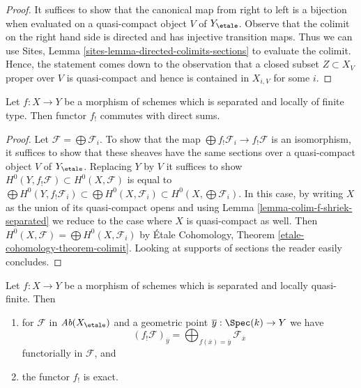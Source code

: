 \begin{proof}
It suffices to show that the canonical map from
right to left is a bijection when evaluated on a quasi-compact
object $V$ of $Y_\etale$.
Observe that the colimit on the right hand side is directed
and has injective transition maps.
Thus we can use
Sites, Lemma \ref{sites-lemma-directed-colimits-sections}
to evaluate the colimit. Hence, the statement comes down
to the observation that a closed subset $Z \subset X_V$ proper over $V$
is quasi-compact and hence is contained in $X_{i, V}$ for some $i$.
\end{proof}

\begin{lemma}
\label{lemma-f-shriek-separated-direct-sums}
Let $f : X \to Y$ be a morphism of schemes which is separated and
locally of finite type. Then functor $f_!$ commutes with direct sums.
\end{lemma}

\begin{proof}
Let $\mathcal{F} = \bigoplus \mathcal{F}_i$. To show that the map
$\bigoplus f_!\mathcal{F}_i \to f_!\mathcal{F}$ is an isomorphism,
it suffices to show that these sheaves have the same sections over
a quasi-compact object $V$ of $Y_\etale$. Replacing $Y$ by $V$
it suffices to show
$H^0(Y, f_!\mathcal{F}) \subset H^0(X, \mathcal{F})$
is equal to
$\bigoplus H^0(Y, f_!\mathcal{F}_i)
\subset \bigoplus H^0(X, \mathcal{F}_i)
\subset H^0(X, \bigoplus \mathcal{F}_i)$.
In this case, by writing $X$ as the union of its quasi-compact opens
and using Lemma \ref{lemma-colim-f-shriek-separated}
we reduce to the case where $X$ is quasi-compact as well.
Then $H^0(X, \mathcal{F}) = \bigoplus H^0(X, \mathcal{F}_i)$
by \'Etale Cohomology, Theorem \ref{etale-cohomology-theorem-colimit}.
Looking at supports of sections the reader easily concludes.
\end{proof}

\begin{lemma}
\label{lemma-lqf-f-shriek-separated-colimits}
Let $f : X \to Y$ be a morphism of schemes which is separated and
locally quasi-finite. Then
\begin{enumerate}
\item for $\mathcal{F}$ in $\textit{Ab}(X_\etale)$ and a geometric
point $\overline{y} : \Spec(k) \to Y$ we have
$$
(f_!\mathcal{F})_{\overline{y}} =
\bigoplus\nolimits_{f(\overline{x}) = \overline{y}} \mathcal{F}_{\overline{x}}
$$
functorially in $\mathcal{F}$, and
\item the functor $f_!$ is exact.
\end{enumerate}
\end{lemma}

